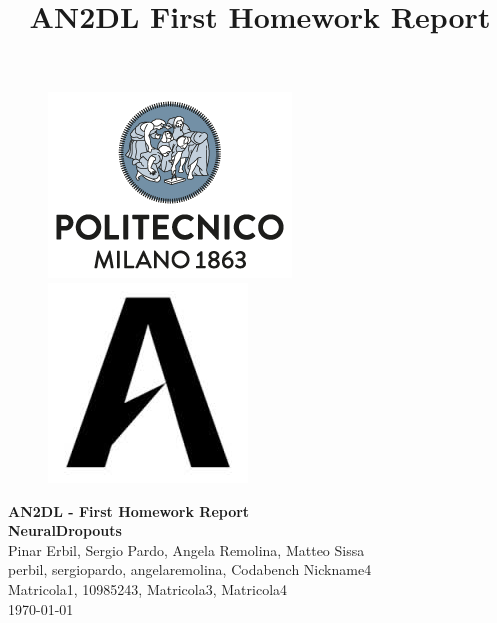 \documentclass[11pt]{article}
\title{AN2DL First Homework Report}
\begin{document}
    
    \begin{figure}[H]
        \raggedright
        \includegraphics[scale=0.4]{polimi.png} \hfill \includegraphics[scale=0.3]{airlab.jpeg}
    \end{figure}
    
    \vspace{5mm}
    
    \begin{center}
        {\Large \textbf{AN2DL - First Homework Report}}\\
        \vspace{2mm}
        {\Large \textbf{NeuralDropouts}}\\
        \vspace{2mm}
        {\large Pinar Erbil,}
        {\large Sergio Pardo,}
        {\large Angela Remolina,}
        {\large Matteo Sissa}\\
        \vspace{2mm}
        {perbil,}
        {sergiopardo,}
        {angelaremolina,}
        {Codabench Nickname4}\\
        \vspace{2mm}
        {Matricola1,}
        {10985243,}
        {Matricola3,}
        {Matricola4}\\
        \vspace{5mm}
        \today
    \end{center}    
    \vspace{5mm}
    
\end{document}
